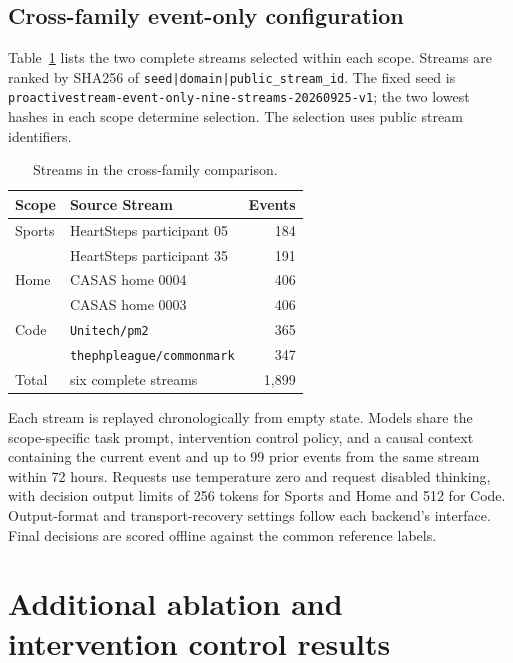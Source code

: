 \subsection{Cross-family event-only configuration}
\label{app:cross_family_streams}

Table~\ref{tab:cross_family_streams} lists the two complete streams selected within each scope.
Streams are ranked by SHA256 of \texttt{seed|}\allowbreak\texttt{domain|}\allowbreak\texttt{public\_stream\_id}.
The fixed seed is \texttt{proactivestream-}\allowbreak\texttt{event-only-}\allowbreak\texttt{nine-streams-}\allowbreak\texttt{20260925-v1}; the two lowest hashes in each scope determine selection.
The selection uses public stream identifiers.

\begin{table}[t]
\centering
\caption{Streams in the cross-family comparison.}
\label{tab:cross_family_streams}
\begin{tabular}{@{}llr@{}}
\toprule
\textbf{Scope} & \textbf{Source Stream} & \textbf{Events} \\
\midrule
Sports & HeartSteps participant 05 & 184 \\
 & HeartSteps participant 35 & 191 \\
Home & CASAS home 0004 & 406 \\
 & CASAS home 0003 & 406 \\
Code & \texttt{Unitech/pm2} & 365 \\
 & \texttt{thephpleague/commonmark} & 347 \\
\midrule
Total & six complete streams & 1,899 \\
\bottomrule
\end{tabular}
\end{table}

Each stream is replayed chronologically from empty state.
Models share the scope-specific task prompt, intervention control policy, and a causal context containing the current event and up to 99 prior events from the same stream within 72 hours.
Requests use temperature zero and request disabled thinking, with decision output limits of 256 tokens for Sports and Home and 512 for Code.
Output-format and transport-recovery settings follow each backend's interface.
Final decisions are scored offline against the common reference labels.

\section{Additional ablation and intervention control results}
\label{app:extended_ablations}


